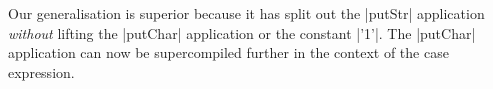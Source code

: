 Our generalisation is superior because it has split out the |putStr| application \textit{without} lifting the |putChar| application or the constant |'1'|. The |putChar| application can now be supercompiled further in the context of the case expression.\noexample

